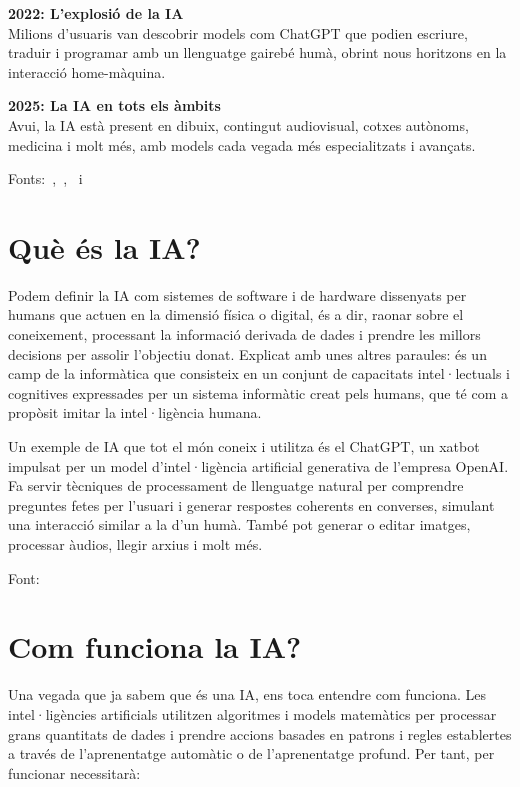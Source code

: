 \begin{enumerate}
    \textbf{2022: L'explosió de la IA}\\
    Milions d'usuaris van descobrir models com ChatGPT que podien escriure, traduir i programar amb un llenguatge gairebé humà, obrint nous horitzons en la interacció home-màquina.

    \textbf{2025: La IA en tots els àmbits}\\
    Avui, la IA està present en dibuix, contingut audiovisual, cotxes autònoms, medicina i molt més, amb models cada vegada més especialitzats i avançats.
\end{enumerate}

Fonts:~\cite{McCarthy_Minsky_Rochester_Shannon_2006},~\cite{deepblue},~\cite{chatGPT2022} i~\cite{10.1093/mind/LIX.236.433}

\section{Què és la IA?}

Podem definir la IA com sistemes de software i de hardware dissenyats per humans que actuen en la dimensió física o digital, és a dir, raonar sobre el coneixement, processant la informació derivada de dades i prendre les millors decisions per assolir l'objectiu donat. Explicat amb unes altres paraules: és un camp de la informàtica que consisteix en un conjunt de capacitats intel·lectuals i cognitives expressades per un sistema informàtic creat pels humans, que té com a propòsit imitar la intel·ligència humana.

Un exemple de IA que tot el món coneix i utilitza és el ChatGPT, un xatbot impulsat per un model d'intel·ligència artificial generativa de l'empresa OpenAI. Fa servir tècniques de processament de llenguatge natural per comprendre preguntes fetes per l'usuari i generar respostes coherents en converses, simulant una interacció similar a la d'un humà. També pot generar o editar imatges, processar àudios, llegir arxius i molt més.

\par Font: \cite{QueÉsLaIA}
\section{Com funciona la IA?}

Una vegada que ja sabem que és una IA, ens toca entendre com funciona. Les intel·ligències artificials utilitzen algoritmes i models matemàtics per processar grans quantitats de dades i prendre accions basades en patrons i regles establertes a través de l'aprenentatge automàtic o de l'aprenentatge profund. Per tant, per funcionar necessitarà:

